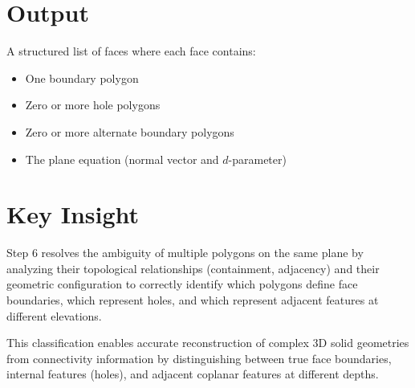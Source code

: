 \documentclass[11pt,a4paper]{article}
\begin{document}
\section{Output}

A structured list of faces where each face contains:

\begin{itemize}
    \item One boundary polygon
    \item Zero or more hole polygons
    \item Zero or more alternate boundary polygons
    \item The plane equation (normal vector and $d$-parameter)
\end{itemize}

\section{Key Insight}

Step 6 resolves the ambiguity of multiple polygons on the same plane by analyzing their topological relationships (containment, adjacency) and their geometric configuration to correctly identify which polygons define face boundaries, which represent holes, and which represent adjacent features at different elevations.

\vspace{1em}

\noindent This classification enables accurate reconstruction of complex 3D solid geometries from connectivity information by distinguishing between true face boundaries, internal features (holes), and adjacent coplanar features at different depths.
\end{document}
